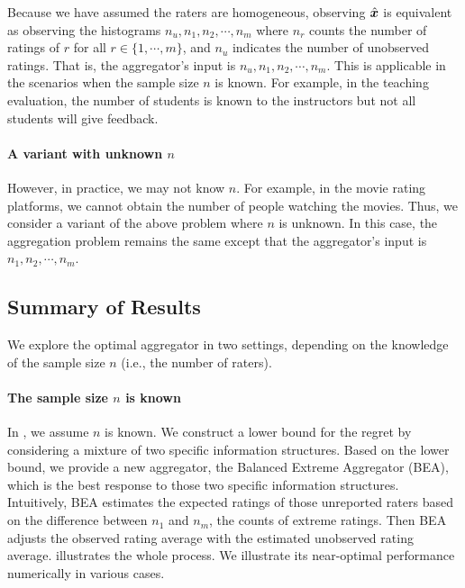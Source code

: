 Because we have assumed the raters are homogeneous, observing $\hat{{\bm{x}}}$ is equivalent as observing the histograms $n_u, n_1,n_2,\cdots,n_m$ where $n_r$ counts the number of ratings of $r$ for all $r\in\{1,\cdots,m\}$, and $n_u$ indicates the number of unobserved ratings. That is, the aggregator's input is $n_u, n_1, n_2,\cdots,n_m$. This is applicable in the scenarios when the sample size $n$ is known. For example, in the teaching evaluation, the number of students is known to the instructors but not all students will give feedback.

\paragraph{A variant with unknown $n$} However, in practice, we may not know $n$. For example, in the movie rating platforms, we cannot obtain the number of people watching the movies. Thus, we consider a variant of the above problem where $n$ is unknown. In this case, the aggregation problem remains the same except that the aggregator's input is $n_1,n_2,\cdots,n_m$. 

\subsection{Summary of Results}

We explore the optimal aggregator in two settings, depending on the knowledge of the sample size $n$ (i.e., the number of raters).

\paragraph{The sample size $n$ is known} In , we assume $n$ is known. We construct a lower bound for the regret by considering a mixture of two specific information structures. Based on the lower bound, we provide a new aggregator, the Balanced Extreme Aggregator (BEA), which is the best response to those two specific information structures. Intuitively, BEA estimates the expected ratings of those unreported raters based on the difference between $n_1$ and $n_m$, the counts of extreme ratings. Then BEA adjusts the observed rating average with the estimated unobserved rating average.  illustrates the whole process. We illustrate its near-optimal performance numerically in various cases.

